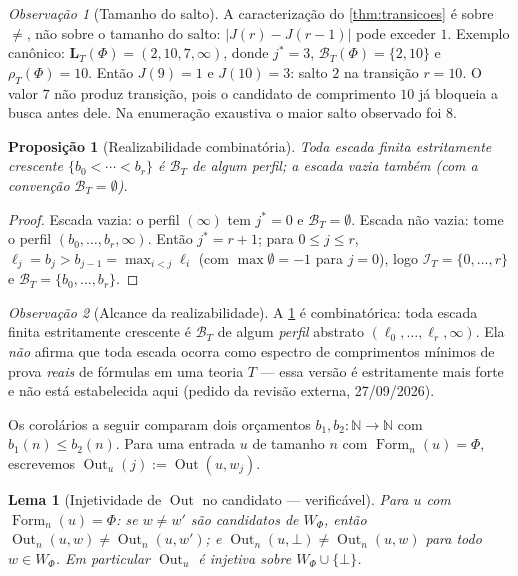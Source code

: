 \documentclass[11pt,a4paper]{article}
\newtheorem{lemma}[theorem]{Lema}
\newtheorem{proposition}[theorem]{Proposição}
\theoremstyle{definition}
\theoremstyle{remark}
\newtheorem*{remark}{Observação}
\newcommand{\Fm}{\operatorname{Form}}
\newcommand{\Out}{\operatorname{Out}}
\newcommand{\N}{\mathbb{N}}
\begin{document}
\begin{remark}[Tamanho do salto]\label{obs:salto}
A caracterização do \cref{thm:transicoes} é sobre $\neq$, não sobre o tamanho
do salto: $|J(r) - J(r-1)|$ pode exceder $1$. Exemplo canônico:
$\mathbf{L}_T(\Phi) = (2, 10, 7, \infty)$, donde $j^{*} = 3$,
$\mathcal{B}_T(\Phi) = \{2, 10\}$ e $\rho_T(\Phi) = 10$. Então
$J(9) = 1$ e $J(10) = 3$: salto $2$ na transição $r = 10$. O valor $7$
não produz transição, pois o candidato de comprimento $10$ já bloqueia a busca
antes dele. Na enumeração exaustiva o maior salto observado foi $8$.
\end{remark}

\begin{proposition}[Realizabilidade combinatória]\label{prop:realizacao}
Toda escada finita estritamente crescente $\{b_0 < \cdots < b_r\}$ é
$\mathcal{B}_T$ de algum perfil; a \emph{escada vazia} também (com a convenção
$\mathcal{B}_T = \emptyset$).
\end{proposition}

\begin{proof}
Escada vazia: o perfil $(\infty)$ tem $j^{*} = 0$ e
$\mathcal{B}_T = \emptyset$. Escada não vazia: tome o perfil
$(b_0, \dots, b_r, \infty)$. Então $j^{*} = r+1$; para $0 \leq j \leq r$,
$\ell_j = b_j > b_{j-1} = \max_{i<j} \ell_i$ (com $\max\emptyset = -1$ para
$j = 0$), logo $\mathcal{I}_T = \{0, \dots, r\}$ e
$\mathcal{B}_T = \{b_0, \dots, b_r\}$.
\end{proof}

\begin{remark}[Alcance da realizabilidade]\label{rem:realiz-alcance}
A \cref{prop:realizacao} \'{e} combinat\'{o}rica: toda escada finita
estritamente crescente \'{e} $\mathcal{B}_T$ de algum \emph{perfil} abstrato
$(\ell_0, \dots, \ell_{r}, \infty)$. Ela \emph{n\~{a}o} afirma que toda
escada ocorra como espectro de comprimentos m\'{i}nimos de prova \emph{reais}
de f\'{o}rmulas em uma teoria $T$ --- essa vers\~{a}o \'{e} estritamente mais
forte e n\~{a}o est\'{a} estabelecida aqui (pedido da revisão externa,
27/09/2026).
\end{remark}

\medskip
\noindent Os corolários a seguir comparam dois orçamentos
$b_1, b_2 : \N \to \N$ com $b_1(n) \leq b_2(n)$. Para uma entrada $u$ de
tamanho $n$ com $\Fm_n(u) = \Phi$, escrevemos
$\Out_u(j) := \Out(u, w_j)$.

\begin{lemma}[Injetividade de $\Out$ no candidato — verific\'{a}vel]\label{lem:outinj}
Para $u$ com $\Fm_n(u) = \Phi$: se $w \neq w'$ são candidatos de $W_\Phi$,
então $\Out_n(u,w) \neq \Out_n(u,w')$; e
$\Out_n(u,\bot) \neq \Out_n(u,w)$ para todo $w \in W_\Phi$. Em particular
$\Out_u$ é injetiva sobre $W_\Phi \cup \{\bot\}$.
\end{lemma}
\end{document}
